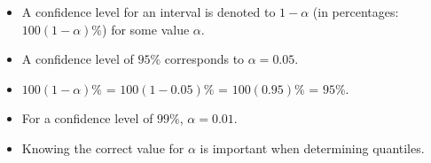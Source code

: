 \documentclass[]{report}
\begin{document}
\begin{framed}

\begin{itemize}
\item A confidence level for an interval is denoted to $1-\alpha$ (in percentages: $100(1-\alpha)\%$) for some value $\alpha$.\smallskip
\item A confidence level of $95\%$ corresponds to $\alpha = 0.05$. \smallskip
\item $100(1-\alpha)\%$ = $100(1-0.05)\%$  = $100(0.95)\%$ = $95\%$. \smallskip
\item For a confidence level of $99\%$, $\alpha = 0.01$. \smallskip
\item Knowing the correct value for $\alpha$ is important when determining quantiles.
\end{itemize}


\end{framed}




















%
%
%

\end{document}
